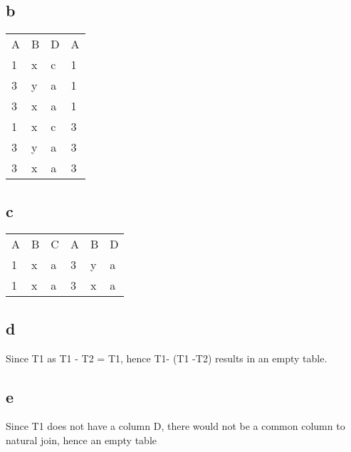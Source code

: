 \documentclass[twoside]{Homework}
\begin{document}
\subsection*{b}
\begin{table}[h]
    \begin{tabular}{llll}
    A & B & D & A \\
    1 & x & c & 1 \\
    3 & y & a & 1 \\
    3 & x & a & 1 \\
    1 & x & c & 3 \\
    3 & y & a & 3 \\
    3 & x & a & 3 \\
    \end{tabular}
\end{table}

\subsection*{c}
\begin{table}[h]
    \begin{tabular}{llllll}
    A & B & C & A & B & D\\
    1 & x & a & 3 & y & a\\
    1 & x & a & 3 & x & a\\
    \end{tabular}
\end{table}

\subsection*{d}
Since T1 as T1 - T2 = T1, hence T1- (T1 -T2) results in an empty table. 

\subsection*{e}
Since T1 does not have a column D, there would not be a common column to natural join, hence an empty table 
\end{document}
